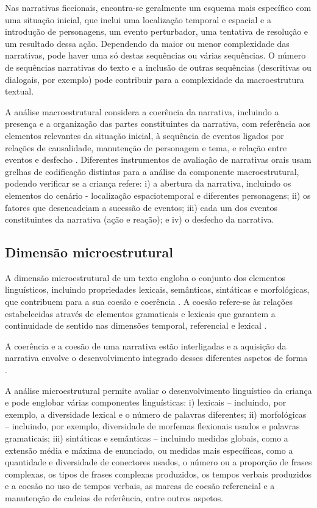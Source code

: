 \documentclass[output=paper,colorlinks,citecolor=brown,booklanguage=portuguese]{langscibook}
\begin{document}
Nas narrativas ficcionais, encontra-se geralmente um esquema mais específico com uma situação inicial, que inclui uma localização temporal e espacial e a introdução de personagens, um evento perturbador, uma tentativa de resolução e um resultado dessa ação. Dependendo da maior ou menor complexidade das narrativas, pode haver uma só destas sequências ou várias sequências. O número de sequências narrativas do texto e a inclusão de outras sequências (descritivas ou dialogais, por exemplo) pode contribuir para a complexidade da macroestrutura textual.

A análise macroestrutural considera a coerência da narrativa, incluindo a presença e a organização das partes constituintes da narrativa, com referência aos elementos relevantes da situação inicial, à sequência de eventos ligados por relações de causalidade, manutenção de personagem e tema, e relação entre eventos e desfecho \citep{Miles2002, Heilmann2010}. Diferentes instrumentos de avaliação de narrativas orais usam grelhas de codificação distintas para a análise da componente macroestrutural, podendo verificar se a criança refere: i) a abertura da narrativa, incluindo os elementos do cenário - localização espaciotemporal e diferentes personagens; ii) os fatores que desencadeiam a sucessão de eventos; iii) cada um dos eventos constituintes da narrativa (ação e reação); e iv) o desfecho da narrativa.

\subsection{Dimensão microestrutural} A dimensão microestrutural de um texto engloba o conjunto dos elementos linguísticos, incluindo propriedades lexicais, semânticas, sintáticas e morfológicas, que contribuem para a sua coesão e coerência \citep{Sautchuk2003}. A coesão refe\-re-se às relações estabelecidas através de elementos gramaticais e lexicais que garantem a continuidade de sentido nas dimensões temporal, referencial e lexical \citep{Halliday1976}.

A coerência e a coesão de uma narrativa estão interligadas e a aquisição da narrativa envolve o desenvolvimento integrado desses diferentes aspetos de forma \citep{Halliday1976, Justice2010}.

A análise microestrutural permite avaliar o desenvolvimento linguístico da criança e pode englobar várias componentes linguísticas: i) lexicais – incluindo, por exemplo, a diversidade lexical e o número de palavras diferentes; ii) morfológicas – incluindo, por exemplo, diversidade de morfemas flexionais usados e palavras gramaticais; iii) sintáticas e semânticas – incluindo medidas globais, como a extensão média e máxima de enunciado, ou medidas mais específicas, como a quantidade e diversidade de conectores usados, o número ou a proporção de frases complexas, os tipos de frases complexas produzidos, os tempos verbais produzidos e a coesão no uso de tempos verbais, as marcas de coesão referencial e a manutenção de cadeias de referência, entre outros aspetos.
\end{document}
